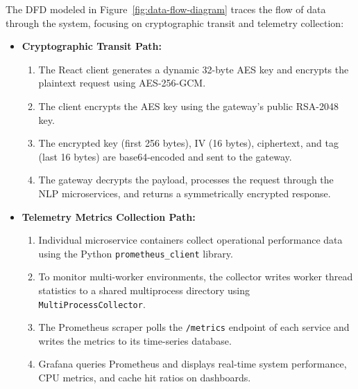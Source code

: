 The DFD modeled in Figure~\ref{fig:data-flow-diagram} traces the flow of data through the system, focusing on cryptographic transit and telemetry collection:
\begin{itemize}
    \item \textbf{Cryptographic Transit Path:} 
    \begin{enumerate}
        \item The React client generates a dynamic 32-byte AES key and encrypts the plaintext request using AES-256-GCM.
        \item The client encrypts the AES key using the gateway's public RSA-2048 key.
        \item The encrypted key (first 256 bytes), IV (16 bytes), ciphertext, and tag (last 16 bytes) are base64-encoded and sent to the gateway.
        \item The gateway decrypts the payload, processes the request through the NLP microservices, and returns a symmetrically encrypted response.
    \end{enumerate}
    \item \textbf{Telemetry Metrics Collection Path:}
    \begin{enumerate}
        \item Individual microservice containers collect operational performance data using the Python \texttt{prometheus\_client} library.
        \item To monitor multi-worker environments, the collector writes worker thread statistics to a shared multiprocess directory using \texttt{MultiProcessCollector}.
        \item The Prometheus scraper polls the \texttt{/metrics} endpoint of each service and writes the metrics to its time-series database.
        \item Grafana queries Prometheus and displays real-time system performance, CPU metrics, and cache hit ratios on dashboards.
    \end{enumerate}
\end{itemize}

